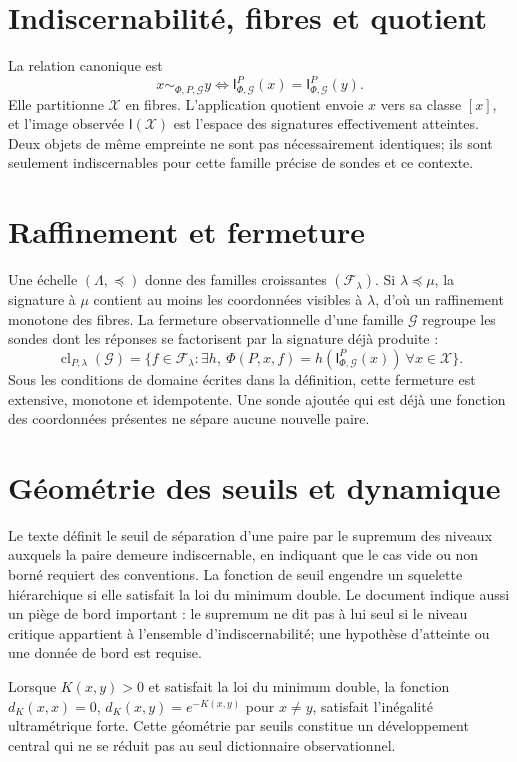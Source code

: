 \documentclass[11pt,a4paper,oneside]{report}
\newcommand{\X}{\mathcal X}
\newcommand{\Fcal}{\mathcal F}
\newcommand{\Gcal}{\mathcal G}
\newcommand{\I}{\mathsf I}
\newcommand{\cl}{\operatorname{cl}}
\begin{document}
\section{Indiscernabilité, fibres et quotient}
La relation canonique est
\[
x\sim_{\Phi,P,\Gcal}y\iff \I^{P}_{\Phi,\Gcal}(x)=\I^{P}_{\Phi,\Gcal}(y).
\]
Elle partitionne \(\X\) en fibres. L'application quotient envoie \(x\) vers sa classe \([x]\), et l'image observée \(\I(\X)\) est l'espace des signatures effectivement atteintes. Deux objets de même empreinte ne sont pas nécessairement identiques; ils sont seulement indiscernables pour cette famille précise de sondes et ce contexte.

\section{Raffinement et fermeture}
Une échelle \((\Lambda,\preceq)\) donne des familles croissantes \((\Fcal_\lambda)\). Si \(\lambda\preceq\mu\), la signature à \(\mu\) contient au moins les coordonnées visibles à \(\lambda\), d'où un raffinement monotone des fibres. La fermeture observationnelle d'une famille \(\Gcal\) regroupe les sondes dont les réponses se factorisent par la signature déjà produite :
\[
\cl_{P,\lambda}(\Gcal)=\{f\in\Fcal_\lambda:\exists h,\ \Phi(P,x,f)=h(\I^P_{\Phi,\Gcal}(x))\ \forall x\in\X\}.
\]
Sous les conditions de domaine écrites dans la définition, cette fermeture est extensive, monotone et idempotente. Une sonde ajoutée qui est déjà une fonction des coordonnées présentes ne sépare aucune nouvelle paire.

\section{Géométrie des seuils et dynamique}
Le texte définit le seuil de séparation d'une paire par le supremum des niveaux auxquels la paire demeure indiscernable, en indiquant que le cas vide ou non borné requiert des conventions. La fonction de seuil engendre un squelette hiérarchique si elle satisfait la loi du minimum double. Le document indique aussi un piège de bord important : le supremum ne dit pas à lui seul si le niveau critique appartient à l'ensemble d'indiscernabilité; une hypothèse d'atteinte ou une donnée de bord est requise.

Lorsque \(K(x,y)>0\) et satisfait la loi du minimum double, la fonction \(d_K(x,x)=0\), \(d_K(x,y)=e^{-K(x,y)}\) pour \(x\ne y\), satisfait l'inégalité ultramétrique forte. Cette géométrie par seuils constitue un développement central qui ne se réduit pas au seul dictionnaire observationnel.
\end{document}
